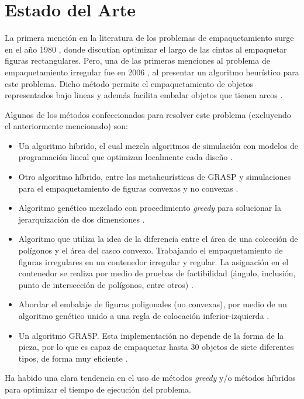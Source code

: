 \section{Estado del Arte}

La primera mención en la literatura de los problemas de empaquetamiento surge en el año 1980 \cite{OrthogonalPackingsTwoDimensions1980}, donde discutían optimizar el largo de las cintas al empaquetar figuras rectangulares. Pero, una de las primeras menciones al problema de empaquetamiento irregular fue en 2006 \cite{BottomLeftFillHeuristic2006}, al presentar un algoritmo heurístico para este problema. Dicho método permite el empaquetamiento de objetos representados bajo lineas y además facilita embalar objetos que tienen arcos \cite{Empaquetamientodeobjetosregularesenuncontenedorrectangular2016}.

Algunos de los métodos confeccionados para resolver este problema (excluyendo el anteriormente mencionado) son:
\begin{itemize}
    \item Un algoritmo híbrido, el cual mezcla algoritmos de simulación con modelos de programación lineal que optimizan localmente cada diseño \cite{hybridisingsimulatedannealingandlinearprogramming2006}.
    \item Otro algoritmo híbrido, entre las metaheurísticas de GRASP y simulaciones para el empaquetamiento de figuras convexas y no convexas \cite{hybridheuristicfortheknapsackproblem2012}.
    \item Algoritmo genético mezclado con procedimiento \textit{greedy} para solucionar la jerarquización de dos dimensiones \cite{AHybridMethodologyforNestingIrregularShapes2013}.
    \item Algoritmo que utiliza la idea de la diferencia entre el área de una colección de polígonos y el área del casco convexo. Trabajando el empaquetamiento de figuras irregulares en un contenedor irregular y regular. La asignación en el contenedor se realiza por medio de pruebas de factibilidad (ángulo, inclusión, punto de intersección de polígonos, entre otros) \cite{Wasteminimizationinirregularstockcutting2013}.
    \item Abordar el embalaje de figuras poligonales (no convexas), por medio de un algoritmo genético unido a una regla de colocación inferior-izquierda \cite{DealingwithNonregularShapesPacking2014}.
    \item Un algoritmo GRASP. Esta implementación no depende de la forma de la pieza, por lo que es capaz de empaquetar hasta 30 objetos de siete diferentes tipos, de forma muy eficiente \cite{AGRASPmetaheuristicfortwodimensionalirregularcuttingstockproblem2015}.
\end{itemize}

Ha habido una clara tendencia en el uso de métodos \textit{greedy} y/o métodos híbridos para optimizar el tiempo de ejecución del problema.

